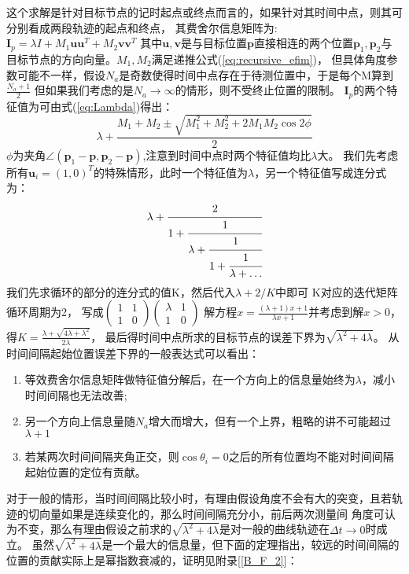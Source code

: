 这个求解是针对目标节点的记时起点或终点而言的，如果针对其时间中点，则其可分别看成两段轨迹的起点和终点，
其费舍尔信息矩阵为:$\bm{I}_p=\lambda I+M_1\bm{u}\bm{u}^T+M_2\bm{v}\bm{v}^T$
其中$\bm{u},\bm{v}$是与目标位置$\bm{p}$直接相连的两个位置$\bm{p}_1,\bm{p}_2$与目标节点的方向向量。$M_1,M_2$满足递推公式(\ref{eq:recursive_efim})，
但具体角度参数可能不一样，假设$N_a$是奇数使得时间中点存在于待测位置中，于是每个M算到$\frac{N_a+1}{2}$
但如果我们考虑的是$N_a\to \infty$的情形，则不受终止位置的限制。
$\bm{I}_p$的两个特征值为可由式(\ref{eq:Lambda})得出：
\[
\lambda+\frac{M_1+M_2\pm \sqrt{M_1^2+M_2^2+2M_1M_2\cos2\phi}}{2}
\]
$\phi$为夹角$\angle(\bm{p}_1-\bm{p},\bm{p}_2-\bm{p})$,注意到时间中点时两个特征值均比$\lambda$大。
我们先考虑所有$\bm{u}_i=(1,0)^T$的特殊情形，此时一个特征值为$\lambda$，另一个特征值写成连分式为：
\begin{equation}\label{eq:gcf_1}
\lambda+\cfrac{2}{1+\cfrac{1}{\lambda+\cfrac{1}{1+\cfrac{1}{\lambda+\dots}}}}
\end{equation}
我们先求循环的部分的连分式的值K，然后代入$\lambda+2/K$中即可
K对应的迭代矩阵循环周期为2，
写成$\begin{pmatrix}1 & 1 \\1 & 0\end{pmatrix}\begin{pmatrix}\lambda & 1 \\1 & 0\end{pmatrix}$
解方程$x=\frac{(\lambda+1)x+1}{\lambda x+1}$并考虑到解$x>0$，得$K=\frac{\lambda+\sqrt{4\lambda+\lambda^2}}{2\lambda}$，
最后得时间中点所求的目标节点的误差下界为$\sqrt{\lambda^2+4\lambda}$。
从时间间隔起始位置误差下界的一般表达式可以看出：
\begin{enumerate}
  \item 等效费舍尔信息矩阵做特征值分解后，在一个方向上的信息量始终为$\lambda$，减小时间间隔也无法改善;
  \item 另一个方向上信息量随$N_a$增大而增大，但有一个上界，粗略的讲不可能超过$\lambda+1$
  \item 若某两次时间间隔夹角正交，则$\cos\theta_i=0$之后的所有位置均不能对时间间隔起始位置的定位有贡献。
\end{enumerate}
对于一般的情形，当时间间隔比较小时，有理由假设角度不会有大的突变，且若轨迹的切向量如果是连续变化的，那么时间间隔充分小，前后两次测量间
角度可认为不变，那么有理由假设之前求的$\sqrt{\lambda^2+4\lambda}$是对一般的曲线轨迹在$\Delta t\to 0$时成立。
虽然$\sqrt{\lambda^2+4\lambda}$是一个最大的信息量，但下面的定理指出，较远的时间间隔的位置的贡献实际上是幂指数衰减的，证明见附录[\ref{B_F_2}]：
